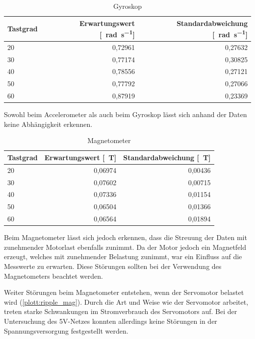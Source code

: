 \begin{table}[H]
  \centering
  \begin{tabularx}{\textwidth}{|X|r|r|}
    \hline
     Tastgrad & Erwartungswert [\SI{}{\radian\per\second}] & Standardabweichung [\SI{}{\radian\per\second}]  \\ \hline \hline
     20 & 0,72961 & 0,27632\\ \hline
     30 & 0,77174 & 0,30825\\ \hline
     40 & 0,78556 & 0,27121\\ \hline
     50 & 0,77792 & 0,27066\\ \hline
     60 & 0,87919 & 0,23369\\ \hline
  \end{tabularx}
  \caption{Gyroskop}%
  \label{tab:gyro}
\end{table}


Sowohl beim Accelerometer als auch beim Gyroskop lässt sich anhand der Daten keine Abhängigkeit erkennen.

\begin{table}[H]
  \centering
  \begin{tabularx}{\textwidth}{|X|r|r|}
    \hline
     Tastgrad & Erwartungswert [\SI{}{\tesla}] & Standardabweichung [\SI{}{\tesla}]  \\ \hline \hline
     20 & 0,06974 & 0,00436\\ \hline
     30 & 0,07602 & 0,00715\\ \hline
     40 & 0,07336 & 0,01154\\ \hline
     50 & 0,06504 & 0,01366\\ \hline
     60 & 0,06564 & 0,01894\\ \hline
  \end{tabularx}
  \caption{Magnetometer}%
  \label{tab:mag}
\end{table}

Beim Magnetometer lässt sich jedoch erkennen, dass die Streuung der Daten mit zunehmender Motorlast ebenfalls zunimmt. Da der Motor jedoch ein Magnetfeld
erzeugt, welches mit zunehmender Belastung zunimmt, war ein Einfluss auf die Messwerte zu erwarten. Diese Störungen sollten bei der Verwendung
des Magnetometers beachtet werden.


Weiter Störungen beim Magnetometer entstehen, wenn der Servomotor belastet wird (\cref{plott:ripple_mag}). Durch die Art und Weise wie der Servomotor arbeitet, treten starke Schwankungen im Stromverbrauch des Servomotors auf.
Bei der Untersuchung des 5V-Netzes konnten allerdings keine Störungen in der Spannungsversorgung festgestellt werden.



